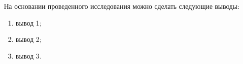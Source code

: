 \newpage
\conclude\label{section:Заключение}

На основании проведенного исследования можно сделать следующие выводы:
\begin{enumerate}	 	
\item вывод 1;
\item вывод 2;
\item вывод 3.
\end{enumerate}	


